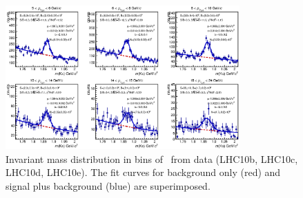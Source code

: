 \begin{figure}[tbh]
\begin{center}
\includegraphics[width=0.8\textwidth]{img/D0_JetPtBins_PtD_20_Data}
 \caption{Invariant mass distribution in bins of \ptchjetdet\ from data (LHC10b, LHC10c, LHC10d, LHC10e). The fit curves for background only (red) and signal plus background (blue) are superimposed.} 
 \label{fig:D0_JetPtBins_PtD_20_Data}
\end{center}
\end{figure}
